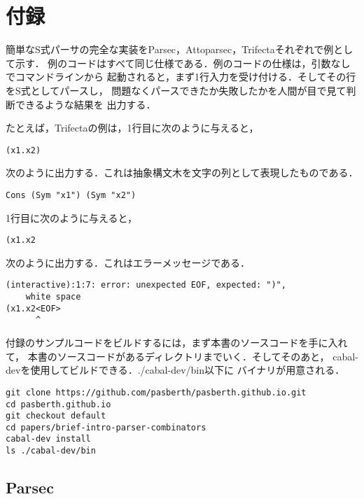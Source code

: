 \documentclass{jarticle}
\begin{document}
\section{付録}

簡単なS式パーサの完全な実装をParsec，Attoparsec，Trifectaそれぞれで例として示す．
例のコードはすべて同じ仕様である．例のコードの仕様は，引数なしでコマンドラインから
起動されると，まず1行入力を受け付ける．そしてその行をS式としてパースし，
問題なくパースできたか失敗したかを人間が目で見て判断できるような結果を
出力する．

たとえば，Trifectaの例は，1行目に次のように与えると，
\begin{lstlisting}
(x1.x2)
\end{lstlisting}
次のように出力する．これは抽象構文木を文字の列として表現したものである．
\begin{lstlisting}
Cons (Sym "x1") (Sym "x2")
\end{lstlisting}
1行目に次のように与えると，
\begin{lstlisting}
(x1.x2
\end{lstlisting}
次のように出力する．これはエラーメッセージである．
\begin{lstlisting}
(interactive):1:7: error: unexpected EOF, expected: ")",
    white space
(x1.x2<EOF>
      ^
\end{lstlisting}

付録のサンプルコードをビルドするには，まず本書のソースコードを手に入れて，
本書のソースコードがあるディレクトリまでいく．そしてそのあと，
cabal-devを使用してビルドできる．./cabal-dev/bin以下に
バイナリが用意される．
\lstset{basicstyle=\ttfamily,}
\begin{lstlisting}
git clone https://github.com/pasberth/pasberth.github.io.git
cd pasberth.github.io
git checkout default
cd papers/brief-intro-parser-combinators
cabal-dev install
ls ./cabal-dev/bin
\end{lstlisting}

\subsection{Parsec}
\end{document}
